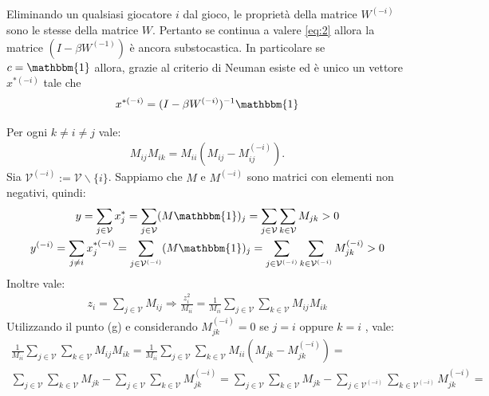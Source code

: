 \documentclass[11pt,largemargins]{homework}
\begin{document}
\begin{alphaparts}
  \questionpart %
  Eliminando un qualsiasi giocatore \(i\) dal gioco, le proprietà della matrice \(W^{(-i)}\) sono le stesse della matrice \(W\). Pertanto se continua a valere \ref{eq:2} allora la matrice \((I-\beta W^{(-1)})\) è ancora substocastica. In particolare se \(c = \mathbbm{1}\) allora, grazie al criterio di Neuman esiste ed è unico un vettore \(x^{*(-i)}\) tale che 
  \begin{gather*}
    x^{*(-i)}  = (I-\beta W^{(-i)})^{-1} \mathbbm{1}
  \end{gather*}

  \questionpart 
  Per ogni \(k \neq i \neq j\) vale:
  \begin{gather*}
    M_{ij}M_{ik} = M_{ii}(M_{ij}-M_{ij}^{(-i)}).
  \end{gather*}
  \questionpart%
  Sia \(\mathcal{V}^{(-i)} := \mathcal{V}\backslash \{i\}\). Sappiamo che \(M\) e \(M^{(-i)}\) sono matrici con elementi non negativi, quindi:
  \begin{gather*}
    y = \sum \limits_{j \in \mathcal{V}} x_j^* = \sum \limits_{j \in \mathcal{V}} (M\mathbbm{1})_j = \sum \limits_{j \in \mathcal{ V}} \sum \limits_{k \in \mathcal{ V}} M_{jk} > 0   
    \\  y^{(-i)} = \sum \limits_{j \neq i} x_j^{*(-i)} = \sum \limits_{j \in \mathcal{V}^{(-i)}} (M\mathbbm{1})_j = \sum \limits_{j \in \mathcal{ V}^{(-i)}} \sum \limits_{k \in \mathcal{ V}^{(-i)}} M^{(-i)}_{jk} > 0   
  \end{gather*}
  Inoltre vale:
  \begin{gather*}
    z_i = \sum \limits_{j \in \mathcal{V}} M_{ij} \Rightarrow \frac{z_i^2}{M_{ii}} =\frac{1}{M_{ii}} \sum \limits_{j \in \mathcal{V}} \sum \limits_{k \in \mathcal{V}} M_{ij}M_{ik} 
  \end{gather*}
  Utilizzando il punto (g) e considerando \(M_{jk}^{(-i)}=0\) se \(j = i\) oppure \(k=i\) , vale:
  \begin{gather*}
    \frac{1}{M_{ii}} \sum \limits_{j \in \mathcal{V}} \sum \limits_{k \in \mathcal{V}} M_{ij}M_{ik} = \frac{1}{M_{ii}}\sum \limits_{j \in \mathcal{V}} \sum \limits_{k \in \mathcal{V}} M_{ii}(M_{jk}-M_{jk}^{(-i)}) = \\
     \sum \limits_{j \in \mathcal{V}} \sum \limits_{k \in \mathcal{V}} M_{jk} - \sum \limits_{j \in \mathcal{V}} \sum \limits_{k \in \mathcal{V}} M_{jk}^{(-i)} = \sum \limits_{j \in \mathcal{V}} \sum \limits_{k \in \mathcal{V}} M_{jk} - \sum \limits_{j \in \mathcal{V}^{(-i)}} \sum \limits_{k \in \mathcal{V}^{(-i)}} M_{jk}^{(-i)} =

\end{gather*}
\end{alphaparts}
\end{document}
